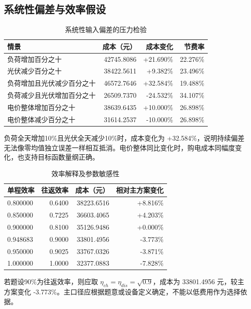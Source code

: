 \subsection{系统性偏差与效率假设}
\begin{table}[htbp]
\centering\small
\caption{系统性输入偏差的压力检验}
\begin{tabular}{lrrr}
\toprule
情景 & 成本（元） & 成本变化 & 节费率\\
\midrule
负荷增加百分之十 & 42745.8086 & +21.690\% & 22.276\%\\
光伏减少百分之十 & 38422.5611 & +9.382\% & 23.496\%\\
负荷增加且光伏减少百分之十 & 46572.7646 & +32.584\% & 19.488\%\\
负荷减少且光伏增加百分之十 & 26509.7370 & -24.532\% & 34.107\%\\
电价整体增加百分之十 & 38639.6435 & +10.000\% & 26.898\%\\
电价整体减少百分之十 & 31614.2537 & -10.000\% & 26.898\%\\
\bottomrule
\end{tabular}
\end{table}
负荷全天增加10\%且光伏全天减少10\%时，成本变化为 +32.584\%，说明持续偏差无法像零均值独立误差一样相互抵消。电价整体同比变化时，购电成本同幅度变化，也支持目标函数量纲正确。
\begin{table}[htbp]
\centering\small
\caption{效率解释及参数敏感性}
\begin{tabular}{lrrr}
\toprule
单程效率 & 往返效率 & 成本（元） & 相对主方案变化\\
\midrule
0.800000 & 0.6400 & 38223.6516 & +8.816\%\\
0.850000 & 0.7225 & 36603.4065 & +4.203\%\\
0.900000 & 0.8100 & 35126.9486 & +0.000\%\\
0.948683 & 0.9000 & 33801.4956 & -3.773\%\\
0.950000 & 0.9025 & 33767.0326 & -3.871\%\\
1.000000 & 1.0000 & 32377.0883 & -7.828\%\\
\bottomrule
\end{tabular}
\end{table}
若题设90\%为往返效率，则应取 $\eta_{ch}=\eta_{dis}=\sqrt{0.9}$，成本为 33801.4956 元，较主方案变化 -3.773\%。主口径应根据题意或设备定义确定，不能以低费用作为选择依据。

